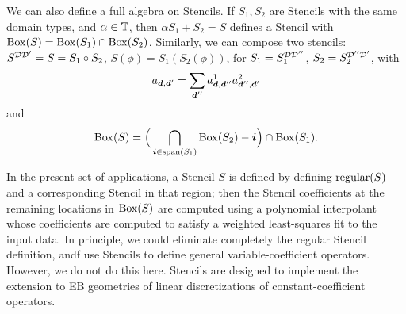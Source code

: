 \documentclass[12pt]{article}
\newcommand{\regular}{{\rm{regular}}}
\newcommand{\spanEB}{{\rm{span}}}
\newcommand{\dgen}{{\mbf{d}}}
\begin{document}
We can also define a full algebra on Stencils. If $S_1,S_2$ are Stencils with the same domain types, and $\alpha \in \mathbb{T}$, then
$\alpha S_1 + S_2= S$ defines a Stencil with ${\rm Box}(S) = {\rm Box}(S_1) \cap {\rm Box}(S_2)$. Similarly, we can compose two stencils: $S^{{\mathcal{D}}{\mathcal{D}}'}= S = S_1 \circ S_2$, $S(\phi) = S_1(S_2(\phi))$, for $S_1 = S_1^{{\mathcal{D}}{\mathcal{D}}''}$, $S_2 = S_2^{{\mathcal{D''}}{\mathcal{D}}'}$,
with
\begin{gather*}
a_{\dgen,\dgen'} = \sum \limits_{\dgen ''} a_{\dgen,\dgen''}^1 a_{\dgen'',\dgen'}^2
\end{gather*}
and 
\begin{gather*}
\MBox(S) = \Big(\bigcap \limits_{\mbf{i} \in \spanEB(S_1)} \MBox(S_2) - \mbf{i} \Big) \cap \MBox(S_1).
\end{gather*}

In the present set of applications, a Stencil $S$ is defined by defining $\regular(S)$ and a corresponding  Stencil in that region; then the Stencil coefficients at the remaining locations in ${\rm Box}(S)$ are computed using a polynomial interpolant whose coefficients are computed to satisfy a weighted least-squares fit to the input data. In principle, we could eliminate completely the regular Stencil definition, andf use Stencils to define general variable-coefficient operators. However, we do not do this here. Stencils are designed to implement the extension to EB geometries of linear discretizations of constant-coefficient operators.
\end{document}
